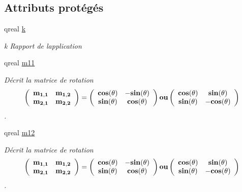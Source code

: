 \subsection*{Attributs protégés}
\begin{DoxyCompactItemize}
\item 
qreal \hyperlink{class_application_aa28f2399db4f7c3a48c98d59e62733ea}{k}
\begin{DoxyCompactList}\small\item\em k Rapport de l\textquotesingle{}application \end{DoxyCompactList}\item 
qreal \hyperlink{class_application_ae4f71662bf31fcbd52aac06c1741bead}{m11}
\begin{DoxyCompactList}\small\item\em Décrit la matrice de rotation \[ \bf \left( \begin{array}{ccc} \bf m_{1,1} & \bf m_{1,2} \\ \bf m_{2,1} & \bf m_{2,2} \\ \end{array} \bf\right) \bf= \bf\left( \begin{array}{ccc} \bf cos(\bf\theta) & \bf -sin(\bf\theta) \\ \bf sin(\bf\theta) & \bf cos(\bf\theta) \\ \end{array} \bf\right) \bf ou \bf\left( \begin{array}{ccc} \bf cos(\bf\theta) & \bf sin(\bf\theta) \\ \bf sin(\bf\theta) & \bf -cos(\bf\theta) \\ \end{array} \bf\right) \]. \end{DoxyCompactList}\item 
qreal \hyperlink{class_application_a6c1095602143845a433dc1c2232479c8}{m12}
\begin{DoxyCompactList}\small\item\em Décrit la matrice de rotation \[ \bf \left( \begin{array}{ccc} \bf m_{1,1} & \bf m_{1,2} \\ \bf m_{2,1} & \bf m_{2,2} \\ \end{array} \bf\right) \bf= \bf\left( \begin{array}{ccc} \bf cos(\bf\theta) & \bf -sin(\bf\theta) \\ \bf sin(\bf\theta) & \bf cos(\bf\theta) \\ \end{array} \bf\right) \bf ou \bf\left( \begin{array}{ccc} \bf cos(\bf\theta) & \bf sin(\bf\theta) \\ \bf sin(\bf\theta) & \bf -cos(\bf\theta) \\ \end{array} \bf\right) \]. \end{DoxyCompactList}\item 

\end{DoxyCompactItemize}
